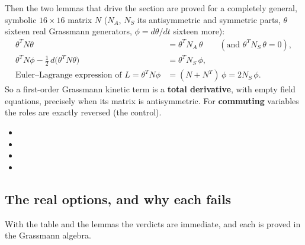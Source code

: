 Then the two lemmas that drive the section are proved for a completely general, symbolic
$16\times16$ matrix $N$ ($N_A$, $N_S$ its antisymmetric and symmetric parts, $\theta$ sixteen real
Grassmann generators, $\phi=d\theta/dt$ sixteen more):
\begin{align*}
  \theta^{T}N\theta &= \theta^{T}N_A\,\theta \qquad(\text{and } \theta^{T}N_S\,\theta=0),\\
  \theta^{T}N\phi-\tfrac12\,d\bigl(\theta^{T}N\theta\bigr) &= \theta^{T}N_S\,\phi,\\
  \text{Euler--Lagrange expression of } L=\theta^{T}N\phi &= (N+N^{T})\,\phi=2N_S\,\phi .
\end{align*}
So a first-order Grassmann kinetic term is a \textbf{total derivative}, with empty field equations,
precisely when its matrix is antisymmetric. For \textbf{commuting} variables the roles are exactly
reversed (the control). 
\begin{itemize}
  \item {}
  \item {}
  \item {}
  \item {}
\end{itemize}

\subsection{The real options, and why each fails}
\label{sec:3.4}

With the table and the lemmas the verdicts are immediate, and each is proved in the Grassmann
algebra.

